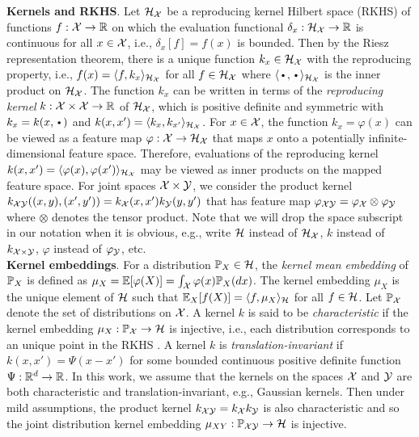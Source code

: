 \textbf{Kernels and RKHS}. Let $\calH_\calX$ be a reproducing kernel Hilbert space (RKHS) of functions $f:\calX\rightarrow\bbR$ on which the evaluation functional $\delta_x:\calH_\calX\rightarrow\bbR$ is continuous for all $x\in\calX$, i.e., $\delta_x[f]=f(x)$ is bounded. Then by the Riesz representation theorem, there is a unique function $k_x\in\calH_\calX$ with the reproducing property, i.e., $f(x)=\langle f,k_x\rangle_{\calH_\calX}$ for all $f\in\calH_\calX$ where $\langle\argdot,\argdot\rangle_{\calH_\calX}$ is the inner product on $\calH_{\calX}$. The function $k_x$ can be written in terms of the \textit{reproducing kernel} $k:\calX\times\calX\rightarrow\bbR$ of $\calH_\calX$, which is positive definite and symmetric with $k_x=k(x,\argdot)$ and $k(x,x')=\langle k_x,k_{x'}\rangle_{\calH_\calX}$. For $x\in\calX$, the function $k_x=\varphi(x)$ can be viewed as a feature map $\varphi:\calX\rightarrow\calH_\calX$ that maps $x$ onto a potentially infinite-dimensional feature space. Therefore, evaluations of the reproducing kernel $k(x,x')=\langle \varphi(x),\varphi(x')\rangle_{\calH_\calX}$ may be viewed as inner products on the mapped feature space. For joint spaces $\calX\times\calY$, we consider the product kernel $k_{\calX\calY}((x,y),(x',y'))=k_\calX(x,x')k_\calY(y,y')$ that has feature map $\varphi_{\calX\calY}=\varphi_\calX\otimes\varphi_\calY$ where $\otimes$ denotes the tensor product. Note that we will drop the space subscript in our notation when it is obvious, e.g., write $\calH$ instead of $\calH_\calX$, $k$ instead of $k_{\calX\times\calY}$, $\varphi$ instead of $\varphi_\calY$, etc.
\\

\textbf{Kernel embeddings}. For a distribution $\P_X\in\calH$, the \textit{kernel mean embedding} of $\P_X$ is defined as $\mu_X=\E[\varphi(X)]=\int_\calX\varphi(x)\P_X(dx)$. The kernel embedding $\mu_X$ is the unique element of $\calH$ such that $\E_X[f(X)]=\langle f,\mu_X\rangle_\calH$ for all $f\in\calH$. Let $\P_\calX$ denote the set of distributions on $\calX$. A kernel $k$ is said to be \textit{characteristic} if the kernel embedding $\mu_X:\P_\calX\rightarrow\calH$ is injective, i.e., each distribution corresponds to an unique point in the RKHS \parencite{Fukumizu:2007}. A kernel $k$ is \textit{translation-invariant} if $k(x,x') = \Psi(x-x')$ for some bounded continuous positive definite function $\Psi:\bbR^d\rightarrow\bbR$. In this work, we assume that the kernels on the spaces $\calX$ and $\calY$ are both characteristic and translation-invariant, e.g., Gaussian kernels. Then under mild assumptions, the product kernel $k_{\calX\calY}=k_\calX k_\calY$ is also characteristic \parencite[Corollary 11]{Sriperumbudur:2010} and so the joint distribution kernel embedding $\mu_{XY}:\P_{\calX\calY}\rightarrow\calH$ is injective.
\\

